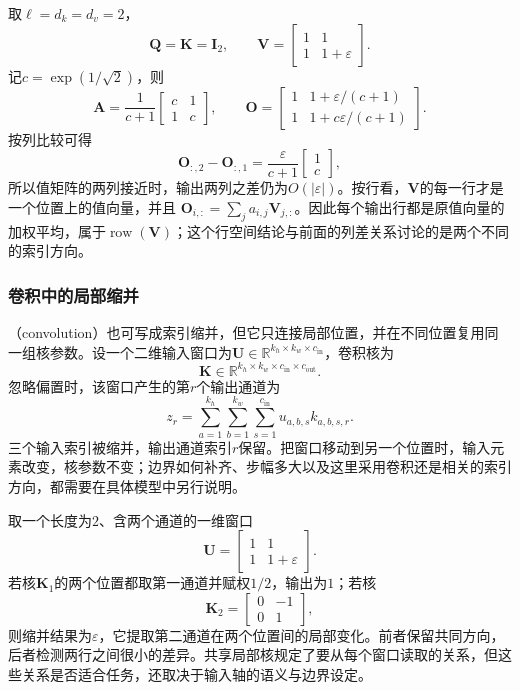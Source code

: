 取$\ell=d_k=d_v=2$，
\[
  \bm{Q}=\bm{K}=\bm{I}_2,
  \qquad
  \bm{V}
  =
  \begin{bmatrix} 1&1\\ 1&1+\varepsilon \end{bmatrix}.
\]
记$c=\exp(1/\sqrt{2})$，则
\[
  \bm{A}
  =
  \frac{1}{c+1}
  \begin{bmatrix} c&1\\ 1&c \end{bmatrix},
  \qquad
  \bm{O}
  =
  \begin{bmatrix} 1&1+\varepsilon/(c+1)\\ 1&1+c\varepsilon/(c+1) \end{bmatrix}.
\]
按列比较可得
\[
  \bm{O}_{:,2}-\bm{O}_{:,1}
  =
  \frac{\varepsilon}{c+1}
  \begin{bmatrix}1\\c\end{bmatrix},
\]
所以值矩阵的两列接近时，输出两列之差仍为$O(|\varepsilon|)$。按行看，$\bm{V}$的每一行才是一个位置上的值向量，并且
$\bm{O}_{i,:}=\sum_j a_{i,j}\bm{V}_{j,:}$。因此每个输出行都是原值向量的加权平均，属于$\operatorname{row}(\bm{V})$；这个行空间结论与前面的列差关系讨论的是两个不同的索引方向。

\subsubsection{卷积中的局部缩并}

（convolution）也可写成索引缩并，但它只连接局部位置，并在不同位置复用同一组核参数。设一个二维输入窗口为$\bm{U}\in\mathbb{R}^{k_h\times k_w\times c_{\mathrm{in}}}$，卷积核为
\[
  \bm{K}\in
  \mathbb{R}^{k_h\times k_w\times c_{\mathrm{in}}\times c_{\mathrm{out}}}.
\]
忽略偏置时，该窗口产生的第$r$个输出通道为
\begin{equation}
  z_r = \sum_{a=1}^{k_h} \sum_{b=1}^{k_w} \sum_{s=1}^{c_{\mathrm{in}}} u_{a,b,s}k_{a,b,s,r}. \label{eq:linear-algebra-convolution-window-contraction}
\end{equation}
三个输入索引被缩并，输出通道索引$r$保留。把窗口移动到另一个位置时，输入元素改变，核参数不变；边界如何补齐、步幅多大以及这里采用卷积还是相关的索引方向，都需要在具体模型中另行说明。

取一个长度为$2$、含两个通道的一维窗口
\[
  \bm{U}
  =
  \begin{bmatrix} 1&1\\ 1&1+\varepsilon \end{bmatrix}.
\]
若核$\bm{K}_1$的两个位置都取第一通道并赋权$1/2$，输出为$1$；若核
\[
  \bm{K}_2
  =
  \begin{bmatrix} 0&-1\\ 0&1 \end{bmatrix},
\]
则缩并结果为$\varepsilon$，它提取第二通道在两个位置间的局部变化。前者保留共同方向，后者检测两行之间很小的差异。共享局部核规定了要从每个窗口读取的关系，但这些关系是否适合任务，还取决于输入轴的语义与边界设定。

